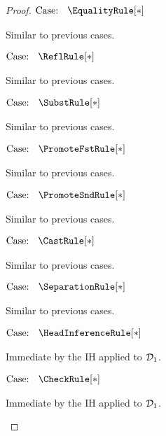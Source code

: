 \begin{proof}
    $\text{Case: }\begin{array}{c} \EqualityRule[*] \end{array}$
    \begin{proofcase}
        Similar to previous cases.
    \end{proofcase}

    $\text{Case: }\begin{array}{c} \ReflRule[*] \end{array}$
    \begin{proofcase}
        Similar to previous cases.
    \end{proofcase}

    $\text{Case: }\begin{array}{c} \SubstRule[*] \end{array}$
    \begin{proofcase}
        Similar to previous cases.
    \end{proofcase}

    $\text{Case: }\begin{array}{c} \PromoteFstRule[*] \end{array}$
    \begin{proofcase}
        Similar to previous cases.
    \end{proofcase}

    $\text{Case: }\begin{array}{c} \PromoteSndRule[*] \end{array}$
    \begin{proofcase}
        Similar to previous cases.
    \end{proofcase}

    $\text{Case: }\begin{array}{c} \CastRule[*] \end{array}$
    \begin{proofcase}
        Similar to previous cases.
    \end{proofcase}

    $\text{Case: }\begin{array}{c} \SeparationRule[*] \end{array}$
    \begin{proofcase}
        Similar to previous cases.
    \end{proofcase}

    $\text{Case: }\begin{array}{c} \HeadInferenceRule[*] \end{array}$
    \begin{proofcase}
        Immediate by the IH applied to $\mathcal{D}_{1}$.
    \end{proofcase}

    $\text{Case: }\begin{array}{c} \CheckRule[*] \end{array}$
    \begin{proofcase}
        Immediate by the IH applied to $\mathcal{D}_{1}$.
    \end{proofcase}
\end{proof}

